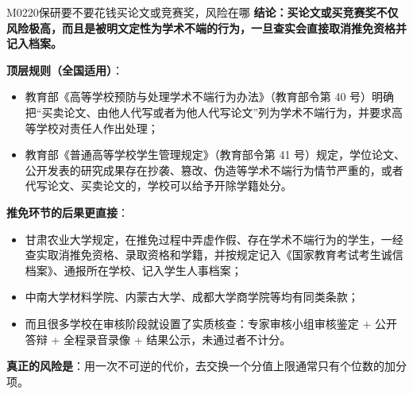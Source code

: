 \begin{qa}{M0220}{保研要不要花钱买论文或竞赛奖，风险在哪}
\textbf{结论：买论文或买竞赛奖不仅风险极高，而且是被明文定性为学术不端的行为，一旦查实会直接取消推免资格并记入档案。}

\textbf{顶层规则（全国适用）}：
\begin{itemize}
  \item 教育部《高等学校预防与处理学术不端行为办法》（教育部令第 40 号）明确把“买卖论文、由他人代写或者为他人代写论文”列为学术不端行为，并要求高等学校对责任人作出处理；
  \item 教育部《普通高等学校学生管理规定》（教育部令第 41 号）规定，学位论文、公开发表的研究成果存在抄袭、篡改、伪造等学术不端行为情节严重的，或者代写论文、买卖论文的，学校可以给予开除学籍处分。
\end{itemize}

\textbf{推免环节的后果更直接}：
\begin{itemize}
  \item 甘肃农业大学规定，在推免过程中弄虚作假、存在学术不端行为的学生，一经查实取消推免资格、录取资格和学籍，并按规定记入《国家教育考试考生诚信档案》、通报所在学校、记入学生人事档案；
  \item 中南大学材料学院、内蒙古大学、成都大学商学院等均有同类条款；
  \item 而且很多学校在审核阶段就设置了实质核查：专家审核小组审核鉴定 + 公开答辩 + 全程录音录像 + 结果公示，未通过者不计分。
\end{itemize}

\textbf{真正的风险是}：用一次不可逆的代价，去交换一个分值上限通常只有个位数的加分项。
\end{qa}

